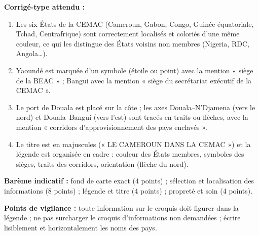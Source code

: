 \documentclass[11pt]{article}
\begin{document}
\begin{corrige}
\textbf{Corrigé-type attendu :}
\begin{enumerate}
\item Les six États de la CEMAC (Cameroun, Gabon, Congo, Guinée équatoriale, Tchad, Centrafrique) sont correctement localisés et coloriés d'une même couleur, ce qui les distingue des États voisins non membres (Nigeria, RDC, Angola\ldots).
\item Yaoundé est marquée d'un symbole (étoile ou point) avec la mention « siège de la BEAC » ; Bangui avec la mention « siège du secrétariat exécutif de la CEMAC ».
\item Le port de Douala est placé sur la côte ; les axes Douala--N'Djamena (vers le nord) et Douala--Bangui (vers l'est) sont tracés en traits ou flèches, avec la mention « corridors d'approvisionnement des pays enclavés ».
\item Le titre est en majuscules (« LE CAMEROUN DANS LA CEMAC ») et la légende est organisée en cadre : couleur des États membres, symboles des sièges, traits des corridors, orientation (flèche du nord).
\end{enumerate}
\textbf{Barème indicatif :} fond de carte exact (4 points) ; sélection et localisation des informations (8 points) ; légende et titre (4 points) ; propreté et soin (4 points).

\textbf{Points de vigilance :} toute information sur le croquis doit figurer dans la légende ; ne pas surcharger le croquis d'informations non demandées ; écrire lisiblement et horizontalement les noms des pays.
\end{corrige}
\end{document}
